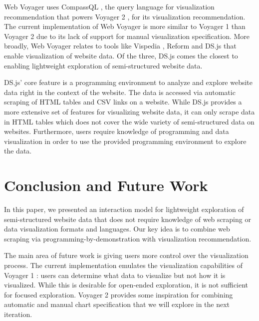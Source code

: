 \documentclass{vgtc}                          %
\begin{document}
Web Voyager uses CompassQL \cite{wongsuphasawat2016}, the query
language for visualization recommendation that powers Voyager 2
\cite{wongsuphasawat2017}, for its visualization recommendation. The
current implementation of Web Voyager is more similar to Voyager 1 \cite{wongsuphasawat2016a} than
Voyager 2 due to its lack of support for manual visualization
specification. More broadly, Web Voyager relates to tools like Vispedia
\cite{chan2008}, Reform \cite{toomim2009} and DS.js \cite{zhang2017}
that enable visualization of website data. Of the three, DS.js comes the
closest to enabling lightweight exploration of semi-structured website
data.

DS.js' core feature is a programming environment to analyze and explore
website data right in the context of the website. The data is accessed
via automatic scraping of HTML tables and CSV links on a website. While
DS.js provides a more extensive set of features for visualizing website
data, it can only scrape data in HTML tables which does not cover the
wide variety of semi-structured data on websites. Furthermore, users
require knowledge of programming and data visualization in order to use
the provided programming environment to explore the data.

\section{Conclusion and Future Work} \label{conclusion}

In this paper, we presented an interaction model for lightweight
exploration of semi-structured website data that does not require
knowledge of web scraping or data visualization formats and languages.
Our key idea is to combine web scraping via programming-by-demonstration
with visualization recommendation.

The main area of future work is giving users more control over the
visualization process. The current implementation emulates the
visualization capabilities of Voyager 1 \cite{wongsuphasawat2016a}:
users can determine what data to visualize but not how it is visualized.
While this is desirable for open-ended exploration, it is not sufficient
for focused exploration. Voyager 2 \cite{wongsuphasawat2017} provides
some inspiration for combining automatic and manual chart specification
that we will explore in the next iteration.

%

%
%
%


\end{document}
